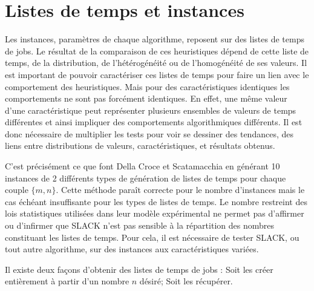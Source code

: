 \documentclass[a4paper,12pt]{report}
\theoremstyle{plain}				%
\theoremstyle{definition}				%
\newcommand\dcs{Della Croce et Scatamacchia\xspace}
\newcommand{\lp}[1]{\todo[author=LP,color=yellow,inline]{#1}}
\begin{document}

\section{Listes de temps et instances} \label{sec:listeTempsInstances}
Les instances, paramètres de chaque algorithme, reposent sur des listes de temps de jobs.
Le résultat de la comparaison de ces heuristiques dépend de cette liste de temps, de la distribution, 
  de l'hétérogénéité ou de l'homogénéité de ses valeurs. 
Il est important de pouvoir caractériser ces listes de temps pour faire un lien avec le comportement 
  des heuristiques. 
Mais pour des caractéristiques identiques les comportements ne sont pas forcément identiques. 
En effet, une même valeur d'une caractéristique peut représenter plusieurs ensembles de 
  valeurs de temps différentes et ainsi impliquer des comportements algorithmiques différents. 
Il est donc nécessaire de multiplier les tests pour voir se dessiner des tendances, 
  des liens entre distributions de valeurs, caractéristiques, et résultats obtenus.

C'est précisément ce que font \dcs en générant 10 instances de 2 différents types de 
  génération de listes de temps pour chaque couple $\{m,n\}$. 
Cette méthode paraît correcte pour le nombre d'instances mais le cas échéant insuffisante pour les types de listes de temps. 
Le nombre restreint des lois statistiques utilisées dans leur modèle expérimental ne permet pas 
  d'affirmer ou d'infirmer que SLACK n'est pas sensible à la répartition des nombres constituant 
  les listes de temps. 
Pour cela, il est nécessaire de tester SLACK, ou tout autre algorithme, sur des instances aux caractéristiques variées.


Il existe deux façons d'obtenir des listes de temps de jobs :  
Soit les créer entièrement à partir d'un nombre $n$ désiré; Soit les récupérer.
\end{document}
